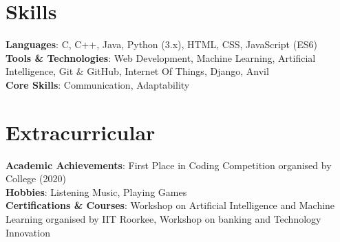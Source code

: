 \documentclass[letterpaper,11pt]{article}
\begin{document}
\section{Skills}
 \begin{itemize}[leftmargin=0.15in, label={}]
    \small{\item{
     \textbf{Languages}{: C, C++, Java, Python (3.x), HTML, CSS, JavaScript (ES6) } \\
     \textbf{Tools \& Technologies}{: Web Development, Machine Learning, Artificial Intelligence, Git \& GitHub, Internet Of Things, Django, Anvil } \\
     \textbf{Core Skills}{: Communication,  Adaptability } \\
    }}
 \end{itemize}
 \vspace{-16pt}

\section{Extracurricular}
 \begin{itemize}[leftmargin=0.15in, label={}]
    \small{\item{
     \textbf{Academic Achievements}{: First Place in Coding Competition organised by College (2020) } \\
    
     \textbf{Hobbies}{: Listening Music, Playing Games } \\
     
     \textbf{Certifications \& Courses}{: Workshop on Artificial Intelligence and Machine Learning organised by IIT Roorkee, Workshop on banking and Technology Innovation } \\
     
    }}
 \end{itemize}
 \vspace{-16pt}
\end{document}
